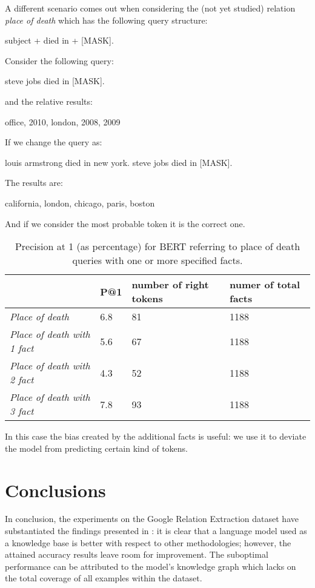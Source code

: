 \documentclass{article}
\begin{document}
A different scenario comes out when considering the (not yet studied) relation \textit{place of death} which has the following query structure:
\begin{center}
subject + died in + [MASK].
\end{center}
Consider the following query:
\begin{center}
steve jobs died in [MASK].
\end{center}
and the relative results:
\begin{center}
office, 2010, london, 2008, 2009
\end{center}
If we change the query as:
\begin{center}
louis armstrong died in new york. steve jobs died in [MASK].
\end{center}
The results are:
\begin{center}
california, london, chicago, paris, boston
\end{center}
And if we consider the most probable token it is the correct one.
\begin{table}[h!]
\centering
\begin{tabular}{l|l|l|l|}
\cline{2-4}
                          & P@1 & number of right tokens & numer of total facts      \\ \hline
\multicolumn{1}{|l|}{\textit{Place of death}} & 6.8 &  81 & 1188   \\ \hline
\multicolumn{1}{|l|}{\textit{Place of death with 1 fact}} & 5.6 & 67 & 1188 \\ \hline
\multicolumn{1}{|l|}{\textit{Place of death with 2 fact}} & 4.3 & 52 & 1188 \\ \hline
\multicolumn{1}{|l|}{\textit{Place of death with 3 fact}} & 7.8 &  93 & 1188 \\ \hline
\end{tabular}
\caption{Precision at 1 (as percentage) for BERT referring to place of death queries with one or more specified facts.}
\label{table: precision at 1 with one or more facts pod}
\end{table}

In this case the bias created by the additional facts is useful: we use it to deviate the model from predicting certain kind of tokens.

\section{Conclusions}
In conclusion, the experiments on the Google Relation Extraction dataset have substantiated the findings presented in \cite{petroni2019language}: it is clear that a language model used as a knowledge base is better with respect to other methodologies; however, the attained accuracy results leave room for improvement. The suboptimal performance can be attributed to the model's knowledge graph which lacks on the total coverage of all examples within the dataset.
\end{document}
